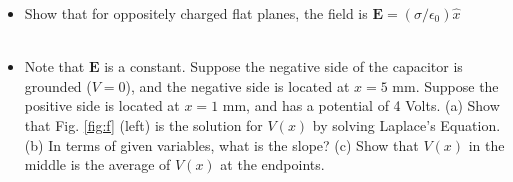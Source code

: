 \documentclass[12pt]{article}
\begin{document}
\begin{itemize}
\item Show that for oppositely charged flat planes, the field is $\mathbf{E} = (\sigma/\epsilon_0) \hat{x}$ \\ \\
\item Note that $\mathbf{E}$ is a constant.  Suppose the negative side of the capacitor is grounded ($V = 0$), and the negative side is located at $x = 5$ mm.  Suppose the positive side is located at $x = 1$ mm, and has a potential of 4 Volts.  (a) Show that Fig. \ref{fig:f} (left) is the solution for $V(x)$ by solving Laplace's Equation. (b) In terms of given variables, what is the slope? (c) Show that $V(x)$ in the middle is the average of $V(x)$ at the endpoints.
\end{itemize}
\end{document}

